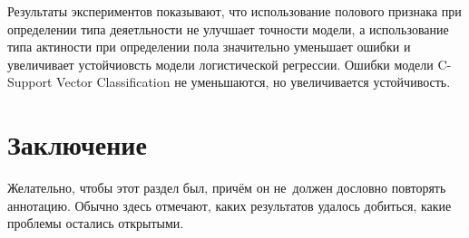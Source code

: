 \documentclass[12pt, twoside]{article}
\begin{document}
Результаты экспериментов показывают, что использование полового признака при определении типа деяетльности не улучшает точности модели, а использование типа актиности при определении пола значительно уменьшает ошибки и увеличивает устойчиовсть модели логистической регрессии. Ошибки модели C-Support Vector Classification не уменьшаются, но увеличивается устойчивость.


\section{Заключение}
Желательно, чтобы этот раздел был, причём он не~должен дословно повторять аннотацию.
Обычно здесь отмечают, каких результатов удалось добиться, какие проблемы остались открытыми.

	
 	
\end{document}
